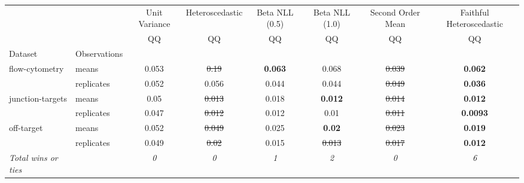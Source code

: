 \begin{tabular}{ll|c|c|c|c|c|c}
\toprule
{} & {} & {Unit Variance} & {Heteroscedastic} & {Beta NLL (0.5)} & {Beta NLL (1.0)} & {Second Order Mean} & {Faithful Heteroscedastic} \\
{} & {} & {QQ} & {QQ} & {QQ} & {QQ} & {QQ} & {QQ} \\
{Dataset} & {Observations} & {} & {} & {} & {} & {} & {} \\
\midrule
\multirow[t]{2}{*}{flow-cytometry} & means & 0.053 & \sout{0.19} & \textbf{0.063} & 0.068 & \sout{0.039} & \textbf{0.062} \\
 & replicates & 0.052 & 0.056 & 0.044 & 0.044 & \sout{0.049} & \textbf{0.036} \\
\multirow[t]{2}{*}{junction-targets} & means & 0.05 & \sout{0.013} & 0.018 & \textbf{0.012} & \sout{0.014} & \textbf{0.012} \\
 & replicates & 0.047 & \sout{0.012} & 0.012 & 0.01 & \sout{0.011} & \textbf{0.0093} \\
\multirow[t]{2}{*}{off-target} & means & 0.052 & \sout{0.049} & 0.025 & \textbf{0.02} & \sout{0.023} & \textbf{0.019} \\
 & replicates & 0.049 & \sout{0.02} & 0.015 & \sout{0.013} & \sout{0.017} & \textbf{0.012} \\
\textit{{Total wins or ties}} &  & \textit{0} & \textit{0} & \textit{1} & \textit{2} & \textit{0} & \textit{6} \\
\bottomrule
\end{tabular}
